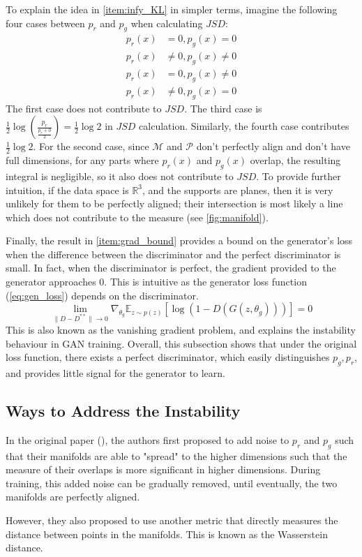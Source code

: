     To explain the idea in \ref{item:infy_KL} in simpler terms, imagine the following four cases between $p_r$ and $p_g$ when calculating $JSD$: 
    \begin{align*}
        p_r(x) &= 0, p_g(x) = 0\\
        p_r(x) &\neq 0, p_g(x) \neq 0\\
        p_r(x) &= 0, p_g(x) \neq 0\\
        p_r(x) &\neq 0, p_g(x) = 0
    \end{align*}
    The first case does not contribute to $JSD$. The third case is $\frac{1}{2}\log\left(\frac{p_r}{\frac{p_r+0}{2}}\right)=\frac{1}{2}\log2$ in $JSD$ calculation. Similarly, the fourth case contributes $\frac{1}{2}\log2$. For the second case, since $\mathcal{M}$ and $\mathcal{P}$ don't perfectly align and don't have full dimensions, for any parts where $p_r(x)$ and $p_g(x)$ overlap, the resulting integral is negligible, so it also does not contribute to $JSD$. To provide further intuition, if the data space is $\mathbb{R}^3$, and the supports are planes, then it is very unlikely for them to be perfectly aligned; their intersection is most likely a line which does not contribute to the measure (see \autoref{fig:manifold}).\par 
    Finally, the result in \ref{item:grad_bound} provides a bound on the generator's loss when the difference between the discriminator and the perfect discriminator is small. In fact, when the discriminator is perfect, the gradient provided to the generator approaches $0$. This is intuitive as the generator loss function (\autoref{eq:gen_loss}) depends on the discriminator.
    $$\lim_{\|D-D^{**}\|\to0}\nabla_{\theta_g}\mathbb{E}_{z\sim p(z)}\left[\log(1-D(G(z,\theta_g)))\right] = 0$$
    This is also known as the vanishing gradient problem, and explains the instability behaviour in GAN training.  Overall, this subsection shows that under the original loss function, there exists a perfect discriminator, which easily distinguishes $p_g,p_r$, and provides little signal for the generator to learn.
    \subsection{Ways to Address the Instability}
    In the original paper (\cite{arjovsky2017towards}), the authors first proposed to add noise to $p_r$ and $p_g$ such that their manifolds are able to "spread" to the higher dimensions such that the measure of their overlaps is more significant in higher dimensions. During training, this added noise can be gradually removed, until eventually, the two manifolds are perfectly aligned.\par 
    However, they also proposed to use another metric that directly measures the distance between points in the manifolds. This is known as the Wasserstein distance.
    
